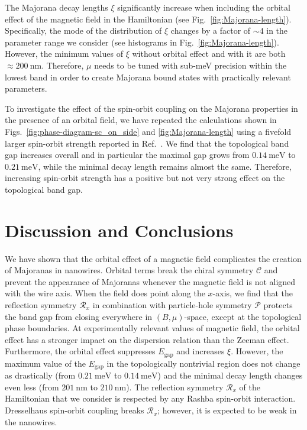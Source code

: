 The Majorana decay lengths $\xi$ significantly increase when including the orbital effect of the magnetic field in the Hamiltonian (see Fig.~\ref{fig:Majorana-length}).
Specifically, the mode of the distribution of $\xi$ changes by a factor of $\sim 4$ in the parameter range we consider (see histograms in Fig.~\ref{fig:Majorana-length}).
However, the minimum values of $\xi$ without orbital effect and with it are both $\approx \SI{200}{\nano\metre}$.
Therefore, $\mu$ needs to be tuned with sub-meV precision within the lowest band in order to create Majorana bound states with practically relevant parameters.

To investigate the effect of the spin-orbit coupling on the Majorana properties in the presence of an orbital field, we have repeated the calculations shown in Figs.~\ref{fig:phase-diagram-sc_on_side} and \ref{fig:Majorana-length} using a fivefold larger spin-orbit strength reported in Ref.~\cite{Weperen2015}.
We find that the topological band gap increases overall and in particular the maximal gap grows from $\SI{0.14}{\milli\electronvolt}$ to $\SI{0.21}{\milli\electronvolt}$, while the minimal decay length remains almost the same.
Therefore, increasing spin-orbit strength has a positive but not very strong effect on the topological band gap.

\section{Discussion and Conclusions}

We have shown that the orbital effect of a magnetic field complicates the creation of Majoranas in nanowires.
Orbital terms break the chiral symmetry $\mathcal{C}$ and prevent the appearance of Majoranas whenever the magnetic field is not aligned with the wire axis.
When the field does point along the $x$-axis, we find that the reflection symmetry $\mathcal{R}_x$ in combination with particle-hole symmetry $\mathcal{P}$ protects the band gap from closing everywhere in $(B,\mu)$-space, except at the topological phase boundaries.
At experimentally relevant values of magnetic field, the orbital effect has a stronger impact on the dispersion relation than the Zeeman effect.
Furthermore, the orbital effect suppresses $E_\textrm{gap}$ and increases $\xi$.
However, the maximum value of the $E_\textrm{gap}$ in the topologically nontrivial region does not change as drastically (from $\SI{0.21}{\milli\electronvolt}$ to $\SI{0.14}{\milli\electronvolt}$) and the minimal decay length changes even less (from $\SI{201}{\nano\metre}$ to $\SI{210}{\nano\metre}$).
The reflection symmetry $\mathcal{R}_x$ of the Hamiltonian that we consider is respected by any Rashba spin-orbit interaction.
Dresselhaus spin-orbit coupling breaks $\mathcal{R}_x$; however, it is expected to be weak in the nanowires.

